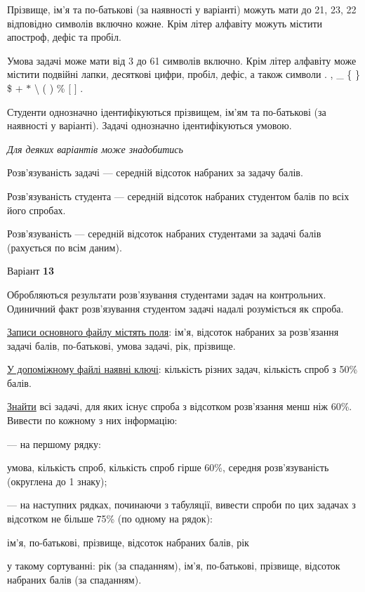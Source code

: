 \documentclass[11pt, ukrainian]{article}
\begin{document}
Прізвище, ім’я та по-батькові (за наявності у варіанті) можуть мати до 21, 23, 22 відповідно символів включно кожне. 
Крім літер алфавіту можуть містити апостроф, дефіс та пробіл.

Умова задачі може мати від 3 до 61 символів включно.
Крім літер алфавіту може містити подвійні лапки, десяткові цифри, пробіл, дефіс,
а також символи . , \_ \{ \} \$ $+$ $*$ {\textbackslash} ( ) \% $[$ $]$ .

Студенти однозначно ідентифікуються прізвищем, ім’ям та по-батькові (за наявності у варіанті).
Задачі однозначно ідентифікуються умовою.

\bigskip\textit{Для деяких варіантів може знадобитись}

Розв'язуваність задачі --- середній відсоток набраних за задачу балів.

Розв'язуваність студента --- середній відсоток набраних студентом балів по всіх його спробах.

Розв'язуваність --- середній відсоток набраних студентами за задачі балів (рахується по всім даним).


\par
\newpage
{\center Варіант  \No \textbf { 13 }\par}
\bigskip
Обробляються результати розв’язування студентами задач на контрольних.
Одиничний факт роз\-в’я\-зу\-вання студентом задачі надалі розуміється як спроба.

\underline{Записи основного файлу містять поля}: ім’я, відсоток набраних за розв’язання задачі балів, по-бать\-ко\-ві, умова задачі, рік, прізвище.

\underline{У допоміжному файлі наявні ключі}: кількість різних задач, кількість спроб з 50\% балів.

\underline{Знайти} всі задачі, для яких існує спроба з відсотком розв’язання менш ніж 60\%. Вивести по кожному з них інформацію:\par
{\noindent}--- на першому рядку:\par
умова, кількість спроб, кількість спроб гірше 60\%, середня розв’язуваність (округлена до 1 знаку);

{\noindent}--- на наступних рядках, починаючи з табуляції, вивести спроби по цих задачах з відсотком не більше 75\% (по одному на рядок):\par
ім’я, по-батькові, прізвище, відсоток набраних балів, рік

{\noindent}у такому сортуванні: рік (за спаданням), ім’я, по-батькові, прізвище, відсоток набраних балів (за спаданням).
\end{document}
